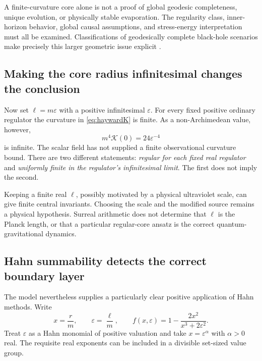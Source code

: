 \documentclass[11pt,a4paper]{article}
\numberwithin{equation}{section}
\theoremstyle{definition}
\theoremstyle{remark}
\newcommand{\Kret}{\mathcal K}
\begin{document}
A finite-curvature core alone is not a proof of global geodesic completeness,
unique evolution, or physically stable evaporation. The regularity class,
inner-horizon behavior, global causal assumptions, and stress-energy
interpretation must all be examined. Classifications of geodesically complete
black-hole scenarios make precisely this larger geometric issue explicit
\cite{CR}.

\subsection{Making the core radius infinitesimal changes the conclusion}
Now set $\ell=m\varepsilon$ with a positive infinitesimal $\varepsilon$.
For every fixed positive ordinary regulator the curvature in
\eqref{eq:haywardK} is finite. As a non-Archimedean value, however,
\[
m^4\Kret(0)=24\varepsilon^{-4}
\]
is infinite. The scalar field has not supplied a finite observational curvature
bound. There are two different statements:
\emph{regular for each fixed real regulator} and \emph{uniformly finite in the
regulator's infinitesimal limit}. The first does not imply the second.

Keeping a finite real $\ell$, possibly motivated by a physical ultraviolet
scale, can give finite central invariants. Choosing the scale and the modified
source remains a physical hypothesis. Surreal arithmetic does not determine
that $\ell$ is the Planck length, or that a particular regular-core ansatz is
the correct quantum-gravitational dynamics.

\subsection{Hahn summability detects the correct boundary layer}
The model nevertheless supplies a particularly clear positive application of
Hahn methods. Write
\begin{equation}\label{eq:dimensionlesscore}
x=\frac rm,\qquad \varepsilon=\frac\ell m,
\qquad f(x,\varepsilon)=1-\frac{2x^2}{x^3+2\varepsilon^2}.
\end{equation}
Treat $\varepsilon$ as a Hahn monomial of positive valuation and take
$x=\varepsilon^\alpha$ with $\alpha>0$ real. The requisite real exponents can
be included in a divisible set-sized value group.
\end{document}
